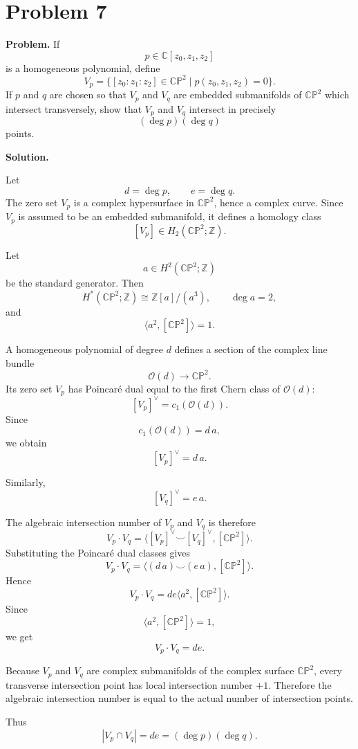 \documentclass[12pt,a4paper]{article}
\theoremstyle{notespace}
\begin{document}
\section{Problem 7}

\textbf{Problem.}
If
\[
p\in \mathbb C[z_0,z_1,z_2]
\]
is a homogeneous polynomial, define
\[
V_p
=
\{[z_0:z_1:z_2]\in \mathbb{CP}^2
\mid
p(z_0,z_1,z_2)=0\}.
\]
If \(p\) and \(q\) are chosen so that \(V_p\) and \(V_q\) are embedded
submanifolds of \(\mathbb{CP}^2\) which intersect transversely, show that
\(V_p\) and \(V_q\) intersect in precisely
\[
(\deg p)(\deg q)
\]
points.

\medskip

\noindent\textbf{Solution.}

Let
\[
d=\deg p,
\qquad
e=\deg q.
\]
The zero set \(V_p\) is a complex hypersurface in \(\mathbb{CP}^2\), hence a
complex curve. Since \(V_p\) is assumed to be an embedded submanifold, it defines
a homology class
\[
[V_p]\in H_2(\mathbb{CP}^2;\mathbb Z).
\]

Let
\[
a\in H^2(\mathbb{CP}^2;\mathbb Z)
\]
be the standard generator. Then
\[
H^*(\mathbb{CP}^2;\mathbb Z)
\cong
\mathbb Z[a]/(a^3),
\qquad
\deg a=2,
\]
and
\[
\langle a^2,[\mathbb{CP}^2]\rangle=1.
\]

A homogeneous polynomial of degree \(d\) defines a section of the complex line
bundle
\[
\mathcal O(d)\to \mathbb{CP}^2.
\]
Its zero set \(V_p\) has Poincar\'e dual equal to the first Chern class of
\(\mathcal O(d)\):
\[
[V_p]^\vee
=
c_1(\mathcal O(d)).
\]
Since
\[
c_1(\mathcal O(d))=d\,a,
\]
we obtain
\[
[V_p]^\vee=d\,a.
\]

Similarly,
\[
[V_q]^\vee=e\,a.
\]

The algebraic intersection number of \(V_p\) and \(V_q\) is therefore
\[
V_p\cdot V_q
=
\langle [V_p]^\vee\smile [V_q]^\vee,[\mathbb{CP}^2]\rangle.
\]
Substituting the Poincar\'e dual classes gives
\[
V_p\cdot V_q
=
\langle (d\,a)\smile(e\,a),[\mathbb{CP}^2]\rangle.
\]
Hence
\[
V_p\cdot V_q
=
de\langle a^2,[\mathbb{CP}^2]\rangle.
\]
Since
\[
\langle a^2,[\mathbb{CP}^2]\rangle=1,
\]
we get
\[
V_p\cdot V_q=de.
\]

Because \(V_p\) and \(V_q\) are complex submanifolds of the complex surface
\(\mathbb{CP}^2\), every transverse intersection point has local intersection
number \(+1\). Therefore the algebraic intersection number is equal to the actual
number of intersection points.

Thus
\[
|V_p\cap V_q|
=
de
=
(\deg p)(\deg q).
\]
\end{document}

